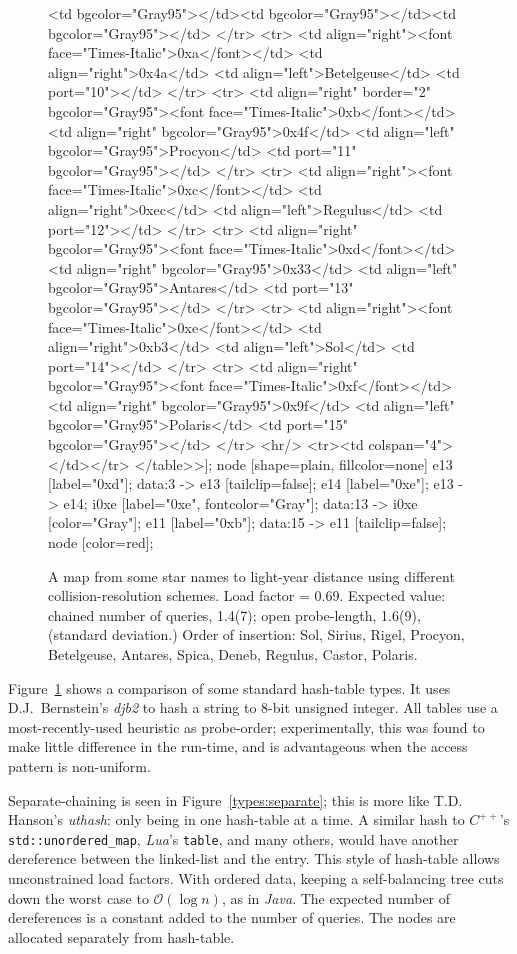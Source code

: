 \documentclass[12pt]{article}
\newcommand{\code}[1]{\colorbox{light-gray}{\texttt{#1}}}
\begin{document}
\begin{figure}
{{		<td bgcolor="Gray95"></td><td bgcolor="Gray95"></td><td bgcolor="Gray95"></td>
	</tr>
	<tr>
		<td align="right"><font face="Times-Italic">0xa</font></td>
		<td align="right">0x4a</td>
		<td align="left">Betelgeuse</td>
		<td port="10">
	</tr>
	<tr>
		<td align="right" border="2" bgcolor="Gray95"><font face="Times-Italic">0xb</font></td>
		<td align="right" bgcolor="Gray95">0x4f</td>
		<td align="left" bgcolor="Gray95">Procyon</td>
		<td port="11" bgcolor="Gray95">
	</tr>
	<tr>
		<td align="right"><font face="Times-Italic">0xc</font></td>
		<td align="right">0xec</td>
		<td align="left">Regulus</td>
		<td port="12">
	</tr>
	<tr>
		<td align="right" bgcolor="Gray95"><font face="Times-Italic">0xd</font></td>
		<td align="right" bgcolor="Gray95">0x33</td>
		<td align="left" bgcolor="Gray95">Antares</td>
		<td port="13" bgcolor="Gray95">
	</tr>
	<tr>
		<td align="right"><font face="Times-Italic">0xe</font></td>
		<td align="right">0xb3</td>
		<td align="left">Sol</td>
		<td port="14">
	</tr>
	<tr>
		<td align="right" bgcolor="Gray95"><font face="Times-Italic">0xf</font></td>
		<td align="right" bgcolor="Gray95">0x9f</td>
		<td align="left" bgcolor="Gray95">Polaris</td>
		<td port="15" bgcolor="Gray95">
	</tr>
	<hr/>
	<tr><td colspan="4"></td></tr>
</table>>];
	node [shape=plain, fillcolor=none]
	e13 [label="0xd"];
	data:3 -> e13 [tailclip=false];
	e14 [label="0xe"];
	e13 -> e14;
	i0xe [label="0xe", fontcolor="Gray"];
	data:13 -> i0xe [color="Gray"];
	e11 [label="0xb"];
	data:15 -> e11 [tailclip=false];
	node [color=red];
		}
	}
	\caption{A map from some star names to light-year distance using different collision-resolution schemes. Load factor  = 0.69. Expected value: chained number of queries, 1.4(7);
open probe-length, 1.6(9),
(standard deviation.)\label{types}
Order of insertion: Sol, Sirius, Rigel, Procyon, Betelgeuse, Antares, Spica, Deneb, Regulus, Castor, Polaris.}
\end{figure}

Figure~\ref{types} shows a comparison of some standard hash-table types. It uses D.J.~Bernstein's {\it djb2} to hash a string to 8-bit unsigned integer. All tables use a most-recently-used heuristic as probe-order; experimentally, this was found to make little difference in the run-time, and is advantageous when the access pattern is non-uniform\cite{brent1973reducing, sleator1985self}.

Separate-chaining is seen in Figure~\ref{types:separate}; this is more like T.D. Hanson's {\it uthash}: only being in one hash-table at a time. A similar hash to {\it $C^{++}$}'s \code{std::unordered\_map}, {\it Lua}'s \code{table}, and many others, would have another dereference between the linked-list and the entry. This style of hash-table allows unconstrained load factors. With ordered data, keeping a self-balancing tree cuts down the worst case to $\mathcal{O}(\log n)$\cite{knuth1998sorting}, as in {\it Java}. The expected number of dereferences is a constant added to the number of queries. The nodes are allocated separately from hash-table.
\end{document}
